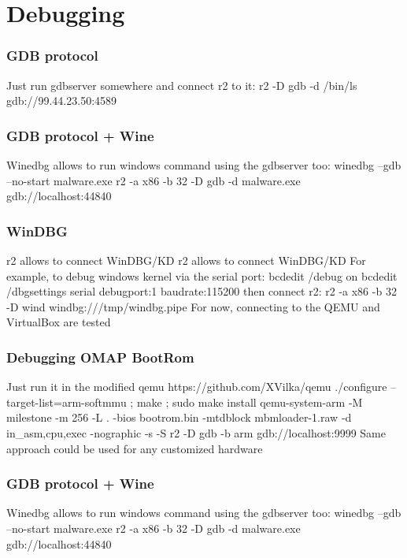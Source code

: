 \documentclass[10pt,pdf,utf8,english,compress,hyperref={unicode}]{beamer}
\begin{document}
\section{Debugging}
\begin{frame}[fragile]
  \frametitle{GDB protocol}
  \center Just run gdbserver somewhere
  \center and connect r2 to it:
  \center r2 -D gdb -d /bin/ls gdb://99.44.23.50:4589
\end{frame}

\begin{frame}[fragile]
  \frametitle{GDB protocol + Wine}
  \center Winedbg allows to run windows command
  \center using the gdbserver too:
  \center winedbg --gdb --no-start malware.exe
  \center r2 -a x86 -b 32 -D gdb -d malware.exe gdb://localhost:44840
\end{frame}

\begin{frame}[fragile]
  \frametitle{WinDBG}
\ifxetex
  \center r2 allows to connect WinDBG/KD
\else
  \center r2 allows to connect WinDBG/KD 
\fi
  \center For example, to debug windows kernel via the serial port:
  \center bcdedit /debug on
  \center bcdedit /dbgsettings serial debugport:1 baudrate:115200
  \center then connect r2:
  \center r2 -a x86 -b 32 -D wind windbg:///tmp/windbg.pipe
  \center For now, connecting to the QEMU and VirtualBox are tested
\end{frame}

\begin{frame}[fragile]
  \frametitle{Debugging OMAP BootRom}
  \center Just run it in the modified qemu https://github.com/XVilka/qemu
  \center ./configure --target-list=arm-softmmu ; make ; sudo make install
  \center qemu-system-arm -M milestone -m 256 -L . -bios bootrom.bin -mtdblock	mbmloader-1.raw -d in\_asm,cpu,exec -nographic -s -S
  \center r2 -D gdb -b arm gdb://localhost:9999
  \center Same approach could be used for any customized hardware
\end{frame}


\begin{frame}[fragile]
  \frametitle{GDB protocol + Wine}
  \center Winedbg allows to run windows command
  \center using the gdbserver too:
  \center winedbg --gdb --no-start malware.exe
  \center r2 -a x86 -b 32 -D gdb -d malware.exe gdb://localhost:44840
\end{frame}
\end{document}
